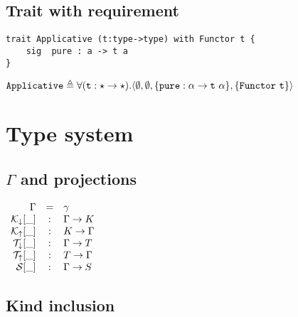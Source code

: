 \documentclass{article}[11pt]
\newcommand{\term}[1]{\verb~#1~}
\begin{document}
    \subsection{Trait with requirement}\label{subsec:trait-with-requirement}

    \begin{verbatim}
trait Applicative (t:type->type) with Functor t {
    sig  pure : a -> t a
}
    \end{verbatim}

    \noindent
    \begin{math}
        \term{Applicative} \triangleq \forall(\term{t}:\star \rightarrow \star).
        \langle
        \emptyset,
        \emptyset,
        \{ \term{pure} : \alpha \rightarrow \term{t}~\alpha \},
        \{ \term{Functor}~\term{t} \}
        \rangle
    \end{math}


    \section{Type system}\label{sec:type-system}

    \subsection{$\Gamma$ and projections}\label{subsec:gamma-and-projections}

    \begin{math}
        \begin{array}{rcl}
            \Gamma       & = & \gamma \\
            {\cal K}_\downarrow[\_] & : & \Gamma \rightarrow K \\
            {\cal K}_\uparrow[\_] & : & K \rightarrow \Gamma \\
            {\cal T}_\downarrow[\_] & : & \Gamma \rightarrow T \\
            {\cal T}_\uparrow[\_] & : & T \rightarrow \Gamma \\
            {\cal S}[\_] & : & \Gamma \rightarrow S \\
        \end{array}
    \end{math}

    \subsection{Kind inclusion}\label{subsec:kind-inclusion}
\end{document}
